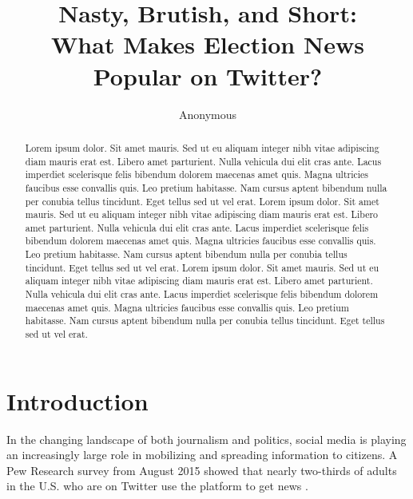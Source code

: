 \documentclass[letterpaper]{article}
\begin{document}
%
\title{Nasty, Brutish, and Short:\\
What Makes Election News Popular on Twitter?}
\author{Anonymous\\
}
\maketitle
\begin{abstract}
Lorem ipsum dolor. Sit amet mauris. Sed ut eu aliquam integer nibh vitae adipiscing diam mauris erat est. Libero amet parturient. Nulla vehicula dui elit cras ante. Lacus imperdiet scelerisque felis bibendum dolorem maecenas amet quis. Magna ultricies faucibus esse convallis quis. Leo pretium habitasse. Nam cursus aptent bibendum nulla per conubia tellus tincidunt. Eget tellus sed ut vel erat.
Lorem ipsum dolor. Sit amet mauris. Sed ut eu aliquam integer nibh vitae adipiscing diam mauris erat est. Libero amet parturient. Nulla vehicula dui elit cras ante. Lacus imperdiet scelerisque felis bibendum dolorem maecenas amet quis. Magna ultricies faucibus esse convallis quis. Leo pretium habitasse. Nam cursus aptent bibendum nulla per conubia tellus tincidunt. Eget tellus sed ut vel erat.
Lorem ipsum dolor. Sit amet mauris. Sed ut eu aliquam integer nibh vitae adipiscing diam mauris erat est. Libero amet parturient. Nulla vehicula dui elit cras ante. Lacus imperdiet scelerisque felis bibendum dolorem maecenas amet quis. Magna ultricies faucibus esse convallis quis. Leo pretium habitasse. Nam cursus aptent bibendum nulla per conubia tellus tincidunt. Eget tellus sed ut vel erat.


\end{abstract}

 
\section{Introduction}
In the changing landscape of both journalism and politics, social media is playing an increasingly large role in mobilizing and spreading information to citizens. A Pew Research survey from August 2015 showed that nearly two-thirds of adults in the U.S. who are on Twitter use the platform to get news \cite{pew-Twitter-news}. 
\end{document}
